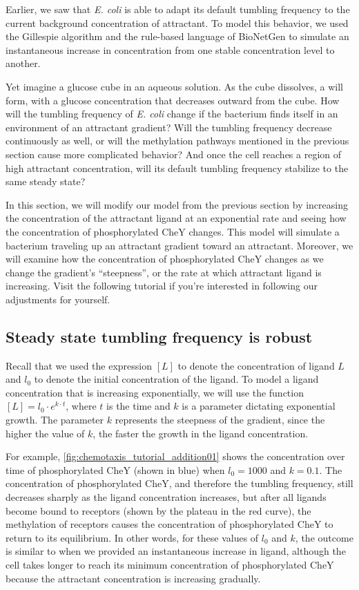 Earlier, we saw that \textit{E. coli} is able to adapt its default tumbling frequency to the current background concentration of attractant. To model this behavior, we used the Gillespie algorithm and the rule-based language of BioNetGen to simulate an instantaneous increase in concentration from one stable concentration level to another.

Yet imagine a glucose cube in an aqueous solution. As the cube dissolves, a  will form, with a glucose concentration that decreases outward from the cube. How will the tumbling frequency of \textit{E. coli} change if the bacterium finds itself in an environment of an attractant gradient?  Will the tumbling frequency decrease continuously as well, or will the methylation pathways mentioned in the previous section cause more complicated behavior? And once the cell reaches a region of high attractant concentration, will its default tumbling frequency stabilize to the same steady state?

In this section, we will modify our model from the previous section by increasing the concentration of the attractant ligand at an exponential rate and seeing how the concentration of phosphorylated CheY changes. This model will simulate a bacterium traveling up an attractant gradient toward an attractant. Moreover, we will examine how the concentration of phosphorylated CheY changes as we change the gradient's ``steepness'', or the rate at which attractant ligand is increasing. Visit the following tutorial  if you're interested in following our adjustments for yourself.

\subsection{Steady state tumbling frequency is robust}

Recall that we used the expression $[L]$ to denote the concentration of ligand $L$ and $l_0$ to denote the initial concentration of the ligand. To model a ligand concentration that is increasing exponentially, we will use the function $[L] = l_0 \cdot e^{k \cdot t}$, where $t$ is the time and $k$ is a parameter dictating exponential growth. The parameter $k$ represents the steepness of the gradient, since the higher the value of $k$, the faster the growth in the ligand concentration.

For example, \autoref{fig:chemotaxis_tutorial_addition01} shows the concentration over time of phosphorylated CheY (shown in blue) when $l_0 = 1000$ and $k = 0.1$. The concentration of phosphorylated CheY, and therefore the tumbling frequency, still decreases sharply as the ligand concentration increases, but after all ligands become bound to receptors (shown by the plateau in the red curve), the methylation of receptors causes the concentration of phosphorylated CheY to return to its equilibrium. In other words, for these values of $l_0$ and $k$, the outcome is similar to when we provided an instantaneous increase in ligand, although the cell takes longer to reach its minimum concentration of phosphorylated CheY because the attractant concentration is increasing gradually.\\


